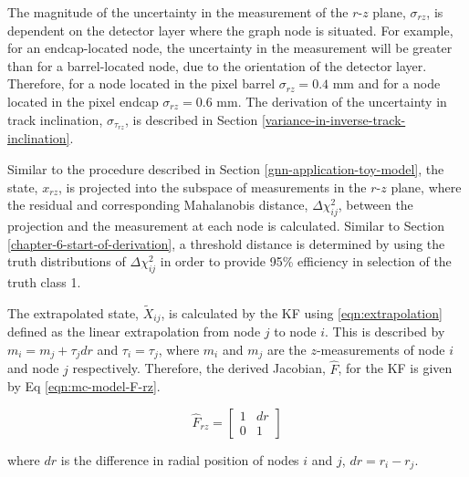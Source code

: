The magnitude of the uncertainty in the measurement of the $r$-$z$ plane, $\sigma_{rz}$, is dependent on the detector layer where the graph node is situated. For example, for an endcap-located node, the uncertainty in the measurement will be greater than for a barrel-located node, due to the orientation of the detector layer. Therefore, for a node located in the pixel barrel $\sigma_{rz} = 0.4$ mm and for a node located in the pixel endcap $\sigma_{rz} = 0.6$ mm. The derivation of the uncertainty in track inclination, $\sigma_{\tau_{rz}}$, is described in Section \ref{variance-in-inverse-track-inclination}. 

Similar to the procedure described in Section \ref{gnn-application-toy-model}, the state, $x_{rz}$, is projected into the subspace of measurements in the $r$-$z$ plane, where the residual and corresponding Mahalanobis distance, $\Delta \chi_{ij}^{2}$, between the projection and the measurement at each node is calculated. Similar to Section \ref{chapter-6-start-of-derivation}, a threshold distance is determined by using the truth distributions of $\Delta \chi_{ij}^{2}$ in order to provide 95\% efficiency in selection of the truth class 1. 




The extrapolated state, $\widetilde{X}_{ij}$, is calculated by the KF using \eqref{eqn:extrapolation} defined as the linear extrapolation from node $j$ to node $i$. This is described by $m_i = m_j + \tau_j dr$ and $\tau_i = \tau_j$, where $m_i$ and $m_j$ are the $z$-measurements of node $i$ and node $j$ respectively. Therefore, the derived Jacobian, $\hat{F}$, for the KF is given by Eq \eqref{eqn:mc-model-F-rz}.


\begin{equation}
\hat{F}_{rz} = \begin{bmatrix} 1 & dr \\ 0 & 1 \end{bmatrix}
\label{eqn:mc-model-F-rz}
\end{equation}

where $dr$ is the difference in radial position of nodes $i$ and $j$, $dr = r_i - r_j$.






